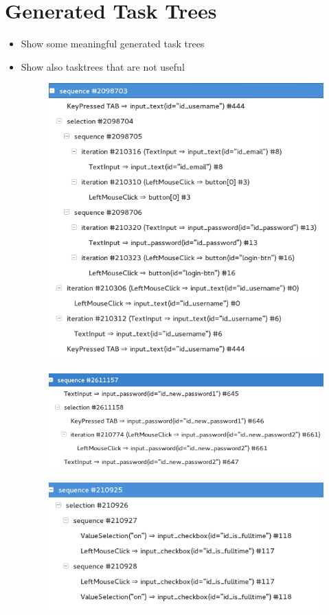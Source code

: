 \section{Generated Task Trees}
\begin{itemize}
	\item Show some meaningful generated task trees
	\item Show also tasktrees that are not useful
\begin{figure}
	\centering
	\includegraphics[]{chapters/casestudy/mixedtasktree.png}
	\caption{}
	\label{}
\end{figure}
\begin{figure}
	\centering
	\includegraphics[]{chapters/casestudy/newpassword.png}
	\caption{}
	\label{}
\end{figure}
\begin{figure}
	\centering
	\includegraphics[]{chapters/casestudy/preprocessing_needed.png}

\end{figure}
\end{itemize}
